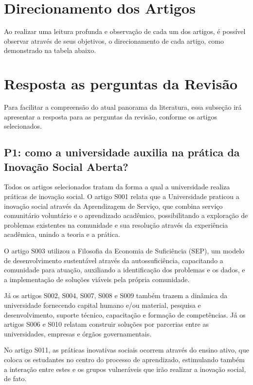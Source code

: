 \section{Direcionamento dos Artigos}

Ao realizar uma leitura profunda e observação de cada um dos artigos, é possível observar através de seus objetivos, o direcionamento de cada artigo, como demonstrado na tabela abaixo.



\section{Resposta as perguntas da Revisão}

Para facilitar a compreensão do atual panorama da literatura, essa subseção irá apresentar a resposta para as perguntas da revisão, conforme os artigos selecionados.

\subsection{P1: como a universidade auxilia na prática da Inovação Social Aberta?}

Todos os artigos selecionados tratam da forma a qual a universidade realiza práticas de inovação social. O artigo S001 relata que a Universidade praticou a inovação social através da Aprendizagem de Serviço, que combina serviço comunitário voluntário e o aprendizado acadêmico, possibilitando a exploração de problemas existentes na comunidade e sua resolução através da experiência acadêmica, unindo a teoria e a prática. 

O artigo S003 utilizou a Filosofia da Economia de Suficiência (SEP), um modelo de desenvolvimento sustentável através da autossuficiência, capacitando a comunidade para atuação, auxiliando a identificação dos problemas e os dados, e a implementação de soluções viáveis pela própria comunidade. 

Já os artigos S002, S004, S007, S008 e S009 também trazem a dinâmica da universidade fornecendo capital humano e/ou material, pesquisa e desenvolvimento, suporte técnico, capacitação e formação de competências. Já os artigos S006 e S010 relatam construir soluções por parcerias entre as universidades, empresas e órgãos governamentais.  

No artigo S011, as práticas inovativas sociais ocorrem através do ensino ativo, que coloca os estudantes no centro do processo de aprendizado, estimulando também a interação entre estes e os grupos vulneráveis que irão realizar a inovação social, de fato. 

